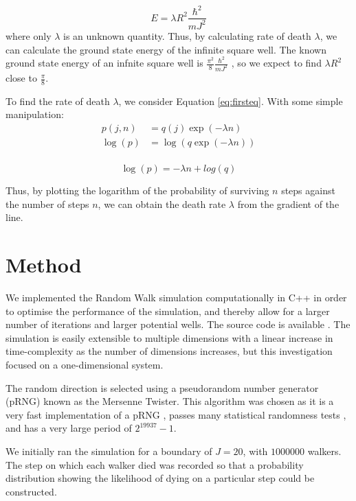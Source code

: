 \documentclass[journal]{IEEEtran}
\begin{document}
\begin{equation}
  E = \lambda R^2 \frac{\hbar^2}{mJ^2}
  \nonumber
\end{equation}
where only $\lambda$ is an unknown quantity. Thus, by calculating rate of death
$\lambda$, we can calculate the ground state energy of the infinite square
well. The known ground state energy of an infnite square well is
$\frac{\pi^2}{8}\frac{\hbar^2}{mJ^2}$ \cite{Davies1998}, so we expect to find $\lambda
R^2$ close to $\frac{\pi}{8}$.

To find the rate of death $\lambda$, we consider Equation \ref{eq:firsteq}. With
some simple manipulation:
\begin{equation}
  \begin{split}
    p(j, n) & = q(j) \exp(-\lambda n)\\
    \log(p) & = \log(q \exp(-\lambda n)) \\
  \end{split}
  \nonumber
\end{equation}

\begin{equation}
  \log(p) = -\lambda n + log(q)
  \label{eq:straightline}
\end{equation}

Thus, by plotting the logarithm of the probability of surviving $n$ steps
against the number of steps $n$, we can obtain the death rate $\lambda$ from the
gradient of the line.

\section{Method}
We implemented the Random Walk simulation computationally in
C++ in order to optimise the performance of the simulation, and thereby allow
for a larger number of iterations and larger potential wells. The source code is
available \cite{Pandian}. The simulation is easily extensible to multiple
dimensions with a linear increase in time-complexity as the number of dimensions
increases, but this investigation focused on a one-dimensional system.

The random direction is selected using a pseudorandom number generator (pRNG)
known as the Mersenne Twister. This algorithm was chosen as it is a very fast
implementation of a pRNG \cite{Route2017}, passes many statistical randomness
tests \cite{Bellamy2013}, and has a very large period of $2^{19937}-1$.

We initially ran the simulation for a boundary of $J = 20$, with $1000000$
walkers. The step on which each walker died was recorded so that a probability
distribution showing the likelihood of dying on a particular step could be
constructed.
\end{document}
